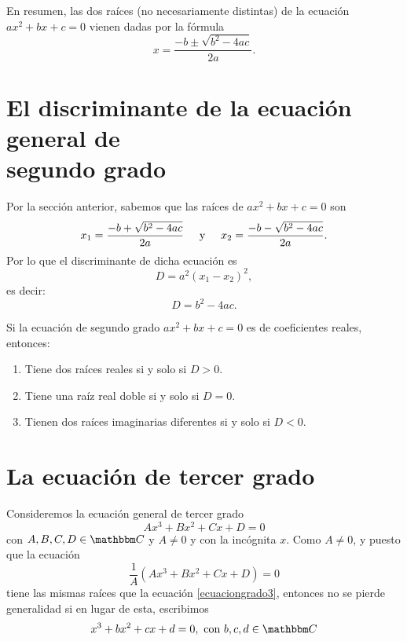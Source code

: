 En resumen, las dos raíces (no necesariamente distintas) de la ecuación $ax^2+bx+c=0$ vienen dadas por la fórmula
$$x=\frac{-b \pm \sqrt{b^2-4ac}}{2a}.$$

\section[El discriminante de la ecuación general de segundo grado]{El discriminante de la ecuación general de \\ segundo grado}

Por la sección anterior, sabemos que las raíces de $ax^2+bx+c=0$ son
$$x_1=\frac{-b + \sqrt{b^2-4ac}}{2a} \hspace{0.5cm} \text{y} \hspace{0.5cm} x_2=\frac{-b - \sqrt{b^2-4ac}}{2a}.$$
Por lo que el discriminante de dicha ecuación es
$$D=a^2(x_1-x_2)^2,$$
es decir:
$$D=b^2-4ac.$$

\begin{observation}
    Si la ecuación de segundo grado $ax^2+bx+c=0$ es de coeficientes reales, entonces:
    \begin{enumerate}[label=\roman*.]
        \item Tiene dos raíces reales si y solo si $D>0$.
        \item Tiene una raíz real doble si y solo si $D=0$.
        \item Tienen dos raíces imaginarias diferentes si y solo si $D<0$.
    \end{enumerate}
\end{observation}

\section{La ecuación de tercer grado} \label{sec:B4}

Consideremos la ecuación general de tercer grado
\begin{equation}
    Ax^3+Bx^2+Cx+D=0 \label{ecuaciongrado3}
\end{equation}
con $A,  B,  C,  D \in \CC$ y $A \neq 0$ y con la incógnita $x$. Como $A \neq 0$, y puesto que la ecuación
$$\frac{1}{A} \left( Ax^3+Bx^2+Cx+D \right) =0$$
tiene las mismas raíces que la ecuación \eqref{ecuaciongrado3}, entonces no se pierde generalidad si en lugar de esta, escribimos
\begin{equation}
    x^3+bx^2+cx+d=0, \text{ con }  b,  c,  d \in \CC \label{ecuaciongrado3.1}
\end{equation}

